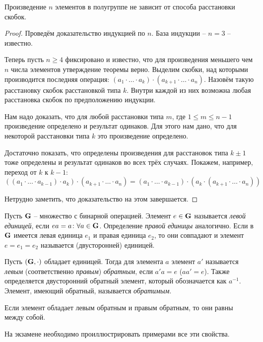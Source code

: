 \begin{theorem}
  Произведение $n$ элементов в полугруппе не зависит от способа расстановки скобок.
\end{theorem}
\begin{proof}
  Проведём доказательство индукцией по $n$. База индукции -- $n=3$ -- известно.
  
  Теперь пусть $n\ge4$ фиксировано и известно, что для произведения меньшего чем $n$ числа элементов утверждение теоремы верно. Выделим скобки, над которыми производится последняя операция: $(a_1\cdot\dots\cdot a_k)\cdot(a_{k+1}\cdot\dots\cdot a_n)$. Назовём такую расстановку скобок расстановкой типа $k$. Внутри каждой из них возможна любая расстановка скобок по предположению индукции. 
  
  Нам надо доказать, что для любой расстановки типа $m$, где $1\le m\le n-1$ произведение определено и результат одинаков. Для этого нам дано, что для некоторой расстановки типа $k$ это произведение определено. 
  
  Достаточно показать, что определены произведения для расстановок типа $k\pm1$ тоже определены и результат одинаков во всех трёх случаях. Покажем, например, переход от $k$ к $k-1$:
  $$((a_1\cdot\dots\cdot a_{k-1})\cdot a_k)\cdot(a_{k+1}\cdot\dots\cdot a_n)=(a_1\cdot\dots\cdot a_{k-1})\cdot(a_k\cdot(a_{k+1}\cdot\dots\cdot a_n))$$
  
  Нетрудно заметить, что доказательство на этом завершается.
\end{proof}

\begin{df}
  Пусть $\mathbf{G}$ -- множество с бинарной операцией. Элемент $e\in\mathbf{G}$ называется \emph{левой единицей}, если $ea=a\colon\forall a\in\mathbf{G}$. Определение \emph{правой единицы} аналогично. Если в $\mathbf{G}$ имеется левая единица $e_1$ и правая единица $e_2$, то они совпадают и элемент $e=e_1=e_2$ называется (двусторонней) единицей.
\end{df}
\begin{df}
  Пусть $(\mathbf{G},\cdot)$ обладает единицей. Тогда для элемента $a$ элемент $a'$ называется \emph{левым} (соответственно \emph{правым}) \emph{обратным}, если $a'a=e$ ($aa'=e$). Также определяется двусторонний обратный элемент, который обозначается как $a^{-1}$. Элемент, имеющий обратный, называется \emph{обратимым}.
\end{df}
\begin{theorem}
  Если элемент обладает левым обратным и правым обратным, то они равны между собой.
\end{theorem}
\begin{note}
  На экзамене необходимо проиллюстрировать примерами все эти свойства. %
\end{note}

